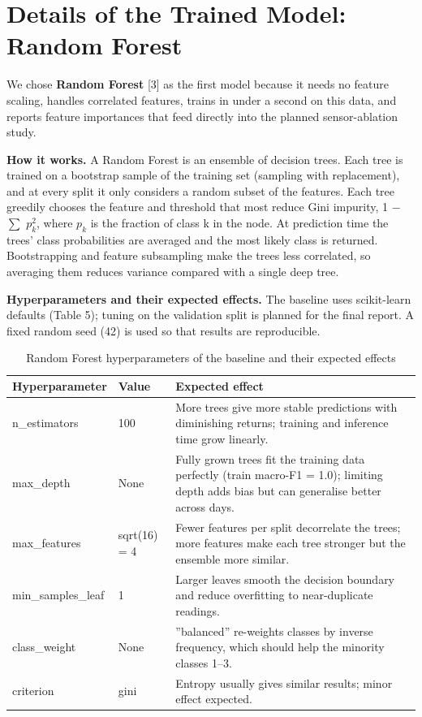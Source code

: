 \documentclass[12pt,a4paper]{article}
\begin{document}
\section{Details of the Trained Model: Random Forest}
We chose \textbf{Random Forest} [3] as the first model because it needs no feature scaling, handles correlated features, trains in under a second on this data, and reports feature importances that feed directly into the planned sensor-ablation study.

\textbf{How it works.} A Random Forest is an ensemble of decision trees. Each tree is trained on a bootstrap sample of the training set (sampling with replacement), and at every split it only considers a random subset of the features. Each tree greedily chooses the feature and threshold that most reduce Gini impurity, 1 $-$ $\sum$ $p_k^2$, where $p_k$ is the fraction of class k in the node. At prediction time the trees' class probabilities are averaged and the most likely class is returned. Bootstrapping and feature subsampling make the trees less correlated, so averaging them reduces variance compared with a single deep tree.

\textbf{Hyperparameters and their expected effects.} The baseline uses scikit-learn defaults (Table 5); tuning on the validation split is planned for the final report. A fixed random seed (42) is used so that results are reproducible.

\begin{table}[H]
\centering
\begin{tabularx}{\textwidth}{llX}
\toprule
\textbf{Hyperparameter} & \textbf{Value} & \textbf{Expected effect} \\
\midrule
n\_estimators & 100 & More trees give more stable predictions with diminishing returns; training and inference time grow linearly. \\
max\_depth & None & Fully grown trees fit the training data perfectly (train macro-F1 = 1.0); limiting depth adds bias but can generalise better across days. \\
max\_features & sqrt(16) = 4 & Fewer features per split decorrelate the trees; more features make each tree stronger but the ensemble more similar. \\
min\_samples\_leaf & 1 & Larger leaves smooth the decision boundary and reduce overfitting to near-duplicate readings. \\
class\_weight & None & ''balanced'' re-weights classes by inverse frequency, which should help the minority classes 1--3. \\
criterion & gini & Entropy usually gives similar results; minor effect expected. \\
\bottomrule
\end{tabularx}
\caption{Random Forest hyperparameters of the baseline and their expected effects}
\end{table}
\end{document}
